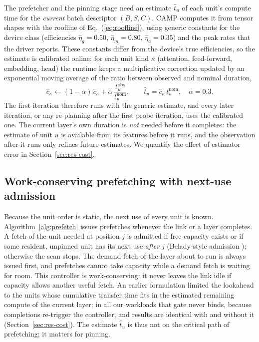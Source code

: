 \documentclass[preprint,12pt]{elsarticle}
\newcommand{\camp}{\textsc{CAMP}}
\begin{document}
The prefetcher and the pinning stage need an estimate $\hat t_u$ of each unit's compute time for the \emph{current} batch descriptor $(B,S,C)$. \camp{} computes it from tensor shapes with the roofline of Eq.~(\ref{eq:roofline}), using generic constants for the device class (efficiencies $\hat\eta_g=0.50$, $\hat\eta_m=0.80$, $\hat\eta_a=0.35$) and the peak rates that the driver reports. These constants differ from the device's true efficiencies, so the estimate is calibrated online: for each unit kind $\kappa$ (attention, feed-forward, embedding, head) the runtime keeps a multiplicative correction updated by an exponential moving average of the ratio between observed and nominal duration,
\begin{equation}
\hat c_\kappa \leftarrow (1-\alpha)\,\hat c_\kappa + \alpha\,\frac{t^{\mathrm{obs}}_u}{t^{\mathrm{nom}}_u},\qquad \hat t_u = \hat c_\kappa\, t^{\mathrm{nom}}_u,\quad \alpha=0.3 .
\label{eq:ema}
\end{equation}
The first iteration therefore runs with the generic estimate, and every later iteration, or any re-planning after the first probe iteration, uses the calibrated one. The current layer's own duration is \emph{not} needed before it completes: the estimate of unit $u$ is available from its features before it runs, and the observation after it runs only refines future estimates. We quantify the effect of estimator error in Section~\ref{sec:res-cost}.

\subsection{Work-conserving prefetching with next-use admission}
\label{sec:prefetch}

Because the unit order is static, the next use of every unit is known. Algorithm~\ref{alg:prefetch} issues prefetches whenever the link or a layer completes. A fetch of the unit needed at position $j$ is admitted if free capacity exists or if some resident, unpinned unit has its next use \emph{after} $j$ (Belady-style admission \cite{belady1966study}); otherwise the scan stops. The demand fetch of the layer about to run is always issued first, and prefetches cannot take capacity while a demand fetch is waiting for room. This controller is work-conserving: it never leaves the link idle if capacity allows another useful fetch. An earlier formulation limited the lookahead to the units whose cumulative transfer time fits in the estimated remaining compute of the current layer; in all our workloads that gate never binds, because completions re-trigger the controller, and results are identical with and without it (Section~\ref{sec:res-cost}). The estimate $\hat t_u$ is thus not on the critical path of prefetching; it matters for pinning.
\end{document}
